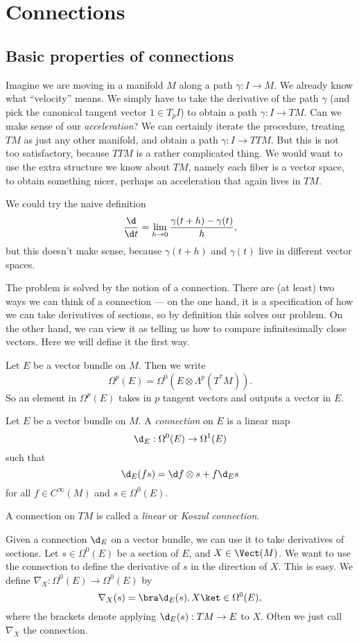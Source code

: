 \documentclass[a4paper]{article}
\begin{document}
\section{Connections}
\subsection{Basic properties of connections}
Imagine we are moving in a manifold $M$ along a path $\gamma: I \to M$. We already know what ``velocity'' means. We simply have to take the derivative of the path $\gamma$ (and pick the canonical tangent vector $1 \in T_p I$) to obtain a path $\gamma: I \to TM$. Can we make sense of our \emph{acceleration}? We can certainly iterate the procedure, treating $TM$ as just any other manifold, and obtain a path $\gamma: I \to TTM$. But this is not too satisfactory, because $TTM$ is a rather complicated thing. We would want to use the extra structure we know about $TM$, namely each fiber is a vector space, to obtain something nicer, perhaps an acceleration that again lives in $TM$.

We could try the naive definition
\[
  \frac{\d}{\d t} = \lim_{h \to 0} \frac{\gamma(t + h) - \gamma(t)}{h},
\]
but this doesn't make sense, because $\gamma(t + h)$ and $\gamma(t)$ live in different vector spaces. %

The problem is solved by the notion of a connection. There are (at least) two ways we can think of a connection --- on the one hand, it is a specification of how we can take derivatives of sections, so by definition this solves our problem. On the other hand, we can view it as telling us how to compare infinitesimally close vectors. Here we will define it the first way.

\begin{notation}
  Let $E$ be a vector bundle on $M$. Then we write
  \[
    \Omega^p(E) = \Omega^0(E \otimes \Lambda^p (T^* M)).
  \]
  So an element in $\Omega^p(E)$ takes in $p$ tangent vectors and outputs a vector in $E$.
\end{notation}

\begin{defi}[Connection]
  Let $E$ be a vector bundle on $M$. A \emph{connection} on $E$ is a linear map
  \[
    \d_E: \Omega^0(E) \to \Omega^1(E)
  \]
  such that
  \[
    \d_E (fs) = \d f \otimes s + f \d_E s
  \]
  for all $f \in C^\infty(M)$ and $s \in \Omega^0(E)$.

  A connection on $TM$ is called a \emph{linear} or \emph{Koszul connection}.
\end{defi}
Given a connection $\d_E$ on a vector bundle, we can use it to take derivatives of sections. Let $s \in \Omega^0(E)$ be a section of $E$, and $X \in \Vect(M)$. We want to use the connection to define the derivative of $s$ in the direction of $X$. This is easy. We define $\nabla_X: \Omega^0(E) \to \Omega^0(E)$ by
\[
  \nabla_X(s) = \bra \d_E(s), X \ket \in \Omega^0(E),
\]
where the brackets denote applying $\d_E(s): TM \to E$ to $X$. Often we just call $\nabla_X$ the connection.
\end{document}
